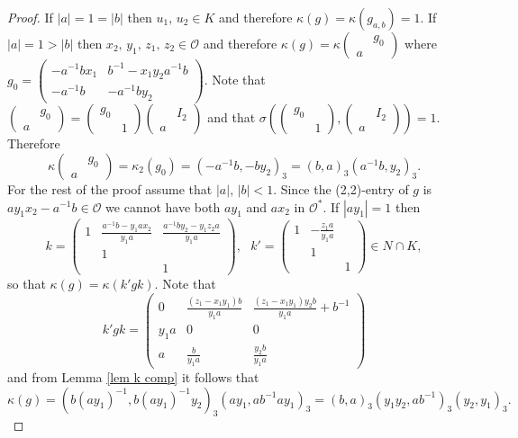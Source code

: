 \documentclass[12pt]{amsart}
\newcommand{\abs}[1]{\left|{#1}\right|}
\renewcommand{\O}{\mathcal{O}}
\newcommand{\sm}[4]{\left(\begin{smallmatrix}{#1}&{#2}\\{#3}&{#4}\end{smallmatrix}\right)}
\theoremstyle{remark}
\begin{document}
\begin{proof}
If $\abs{a}=1=\abs{b}$ then $u_1,\,u_2\in K$ and therefore $\kappa(g)=\kappa(g_{a,b})=1$. If $\abs{a}=1>\abs{b}$ then $x_2,\,y_1,\,z_1,\,z_2\in \O$ and therefore 
$\kappa(g)=\kappa\sm{}{g_0}{a}{}$ where $g_0=\sm{-a^{-1}bx_1}{b^{-1}-x_1y_2a^{-1}b}{-a^{-1}b}{-a^{-1}by_2}$. Note that $\sm{}{g_0}{a}{}=\sm{g_0}{}{}{1}\sm{}{I_2}{a}{}$ and that $\sigma(\sm{g_0}{}{}{1},\sm{}{I_2}{a}{})=1$. Therefore 
\[
\kappa\sm{}{g_0}{a}{}=\kappa_2(g_0)=(-a^{-1}b,-by_2)_3=(b,a)_3(a^{-1}b,y_2)_3.
\]
For the rest of the proof assume that $\abs{a},\,\abs{b}<1$. Since the (2,2)-entry of $g$ is $ay_1x_2-a^{-1}b\in \O$ we cannot have both $ay_1$ and $ax_2$ in $\O^*$. 
If $\abs{ay_1}=1$ then
\[
k=\begin{pmatrix} 1 & \frac{a^{-1}b-y_1a x_2}{y_1a} & \frac{a^{-1}by_2-y_1z_2 a}{y_1a} \\ & 1 & \\ & & 1 \end{pmatrix} 
, \ \ \ k'=\begin{pmatrix}  1 & -\frac{z_1a}{y_1 a} & \\ & 1 & \\ & & 1\end{pmatrix}\in N\cap K,
\]
so that $\kappa(g)=\kappa(k'gk)$. Note that
\[
k'gk=\begin{pmatrix}    0 & \frac{(z_1-x_1y_1)b}{y_1a} & \frac{(z_1-x_1y_1)y_2b}{y_1a}+b^{-1} \\ y_1a & 0 &0 \\ a & \frac{b}{y_1a} & \frac{y_2b}{y_1a}   \end{pmatrix}
\]
and from Lemma \ref{lem k comp} it follows that
\[
\kappa(g)=(b(ay_1)^{-1},b(ay_1)^{-1}y_2)_3(ay_1,ab^{-1}ay_1)_3=(b,a)_3(y_1y_2,ab^{-1})_3(y_2,y_1)_3.
\]


\end{proof}
\end{document}

